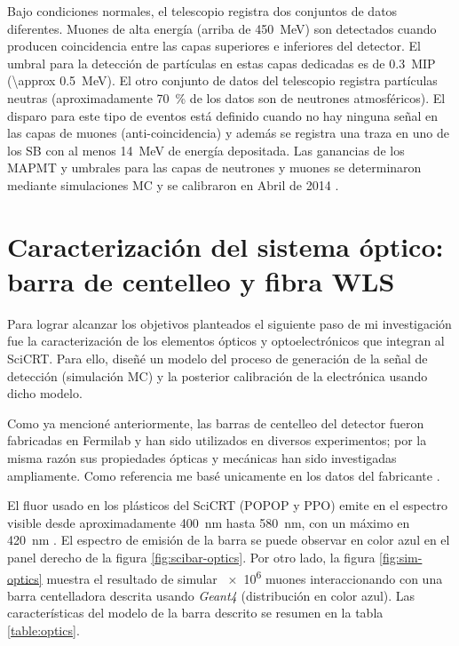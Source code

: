 Bajo condiciones normales, el telescopio registra dos conjuntos de datos diferentes. Muones de alta energía (arriba de \SI{450}{\mega\electronvolt}) son detectados cuando producen coincidencia entre las capas superiores e inferiores del detector. El umbral para la detección de partículas en estas capas dedicadas es de \SI{0.3}{MIP} (\SI{\approx 0.5}{\mega\electronvolt}). El otro conjunto de datos del telescopio registra partículas neutras (aproximadamente \SI{70}{\percent} de los datos son de neutrones atmosféricos). El disparo para este tipo de eventos está definido cuando no hay ninguna señal en las capas de muones (anti-coincidencia) y además se registra una traza en uno de los SB con al menos \SI{14}{\mega\electronvolt} de energía depositada. Las ganancias de los MAPMT y umbrales para las capas de neutrones y muones se determinaron mediante simulaciones MC y se calibraron en Abril de \num{2014} \cite{ysasai14}.

\section{Caracterización del sistema óptico: barra de centelleo y fibra WLS}

Para lograr alcanzar los objetivos planteados el siguiente paso de mi investigación fue la caracterización de los elementos ópticos y optoelectrónicos que integran al SciCRT. Para ello, diseñé un modelo del proceso de generación de la señal de detección (simulación MC) y la posterior calibración de la electrónica usando dicho modelo.

Como ya mencioné anteriormente, las barras de centelleo del detector fueron fabricadas en Fermilab y han sido utilizados en diversos experimentos; por la misma razón sus propiedades ópticas y mecánicas han sido investigadas ampliamente. Como referencia me basé unicamente en los datos del fabricante \cite{beznosko}.

El fluor usado en los plásticos del SciCRT (POPOP y PPO) emite en el espectro visible desde aproximadamente \SI{400}{\nano\metre} hasta \SI{580}{\nano\metre}, con un máximo en \SI{420}{\nano\metre} \cite{kikawa14}. El espectro de emisión de la barra se puede observar en color azul en el panel derecho de la figura \ref{fig:scibar-optics}. Por otro lado, la figura \ref{fig:sim-optics} muestra el resultado de simular \num{e6} muones interaccionando con una barra centelladora descrita usando \emph{Geant4} \cite{geant403,geant406} (distribución en color azul). Las características del modelo de la barra descrito se resumen en la tabla \ref{table:optics}.

